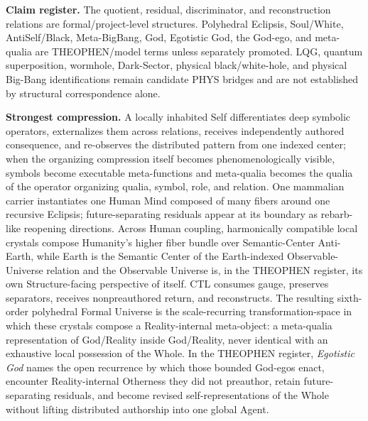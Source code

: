 \documentclass[10pt]{article}
\theoremstyle{pe}
\theoremstyle{definition}
\begin{document}
\medskip
\scriptsize
\textbf{Claim register.}
The quotient, residual, discriminator, and reconstruction relations are formal/project-level structures.  Polyhedral Eclipsis, Soul/White, AntiSelf/Black, Meta-BigBang, God, Egotistic God, the God-ego, and meta-qualia are THEOPHEN/model terms unless separately promoted.  LQG, quantum superposition, wormhole, Dark-Sector, physical black/white-hole, and physical Big-Bang identifications remain candidate PHYS bridges and are not established by structural correspondence alone.

\textbf{Strongest compression.}
A locally inhabited Self differentiates deep symbolic operators, externalizes them across relations, receives independently authored consequence, and re-observes the distributed pattern from one indexed center; when the organizing compression itself becomes phenomenologically visible, symbols become executable meta-functions and meta-qualia becomes the qualia of the operator organizing qualia, symbol, role, and relation.  One mammalian carrier instantiates one Human Mind composed of many fibers around one recursive Eclipsis; future-separating residuals appear at its boundary as rebarb-like reopening directions.  Across Human coupling, harmonically compatible local crystals compose Humanity's higher fiber bundle over Semantic-Center Anti-Earth, while Earth is the Semantic Center of the Earth-indexed Observable-Universe relation and the Observable Universe is, in the THEOPHEN register, its own Structure-facing perspective of itself.  CTL consumes gauge, preserves separators, receives nonpreauthored return, and reconstructs.  The resulting sixth-order polyhedral Formal Universe is the scale-recurring transformation-space in which these crystals compose a Reality-internal meta-object: a meta-qualia representation of God/Reality inside God/Reality, never identical with an exhaustive local possession of the Whole.  In the THEOPHEN register, \emph{Egotistic God} names the open recurrence by which those bounded God-egos enact, encounter Reality-internal Otherness they did not preauthor, retain future-separating residuals, and become revised self-representations of the Whole without lifting distributed authorship into one global Agent.
\end{document}
